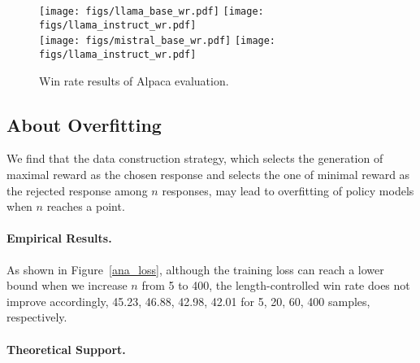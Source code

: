 % 





\begin{figure*}[!ht]
\centering

    \begin{minipage}[c]{\linewidth}
        \centering
        \texttt{[image: figs/llama\_base\_wr.pdf]}
        \hfill
        \texttt{[image: figs/llama\_instruct\_wr.pdf]}
        \\
        \texttt{[image: figs/mistral\_base\_wr.pdf]}
        \hfill
        \texttt{[image: figs/llama\_instruct\_wr.pdf]}
    \end{minipage}

\caption{Win rate results of Alpaca evaluation.}
\label{main_fig_wr}
\end{figure*}



\subsection{About Overfitting}
\label{overfitting}

We find that the data construction strategy, which selects the generation of maximal reward as the chosen response and selects the one of minimal reward as the rejected response among $n$ responses, may lead to overfitting of policy models when $n$ reaches a point.
\paragraph{Empirical Results.} As shown in Figure~\ref{ana_loss}, although the training loss can reach a lower bound when we increase $n$ from 5 to 400, the length-controlled win rate does not improve accordingly, 45.23, 46.88, 42.98, 42.01 for 5, 20, 60, 400 samples, respectively.
 
\paragraph{Theoretical Support.}

